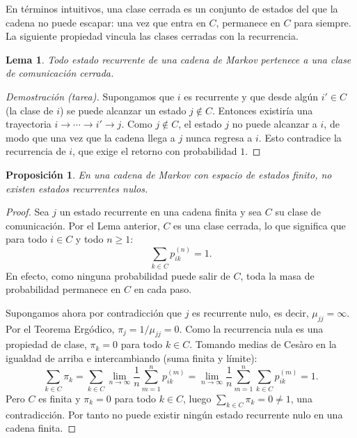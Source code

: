 \documentclass[12pt]{book}
\newtheorem{lemma}{Lema}[section]
\newtheorem{proposition}{Proposición}[chapter]
\begin{document}
En términos intuitivos, una clase cerrada es un conjunto de estados del que la cadena no puede escapar: una vez que entra en $C$, permanece en $C$ para siempre. La siguiente propiedad vincula las clases cerradas con la recurrencia.

\begin{lemma}
    Todo estado recurrente de una cadena de Markov pertenece a una clase de comunicación cerrada.
\end{lemma}
\begin{proof}[Demostración (tarea)]
    Supongamos que $i$ es recurrente y que desde algún $i' \in C$ (la clase de $i$) se puede alcanzar un estado $j \notin C$. Entonces existiría una trayectoria $i \to \cdots \to i' \to j$. Como $j \notin C$, el estado $j$ no puede alcanzar a $i$, de modo que una vez que la cadena llega a $j$ nunca regresa a $i$. Esto contradice la recurrencia de $i$, que exige el retorno con probabilidad $1$.
\end{proof}

\begin{proposition}
En una cadena de Markov con espacio de estados finito, no existen estados recurrentes nulos.
\end{proposition}

\begin{proof}
    Sea $j$ un estado recurrente en una cadena finita y sea $C$ su clase de comunicación. Por el Lema anterior, $C$ es una clase cerrada, lo que significa que para todo $i \in C$ y todo $n \ge 1$:
    \[
        \sum_{k \in C} p_{ik}^{(n)} = 1.
    \]
    En efecto, como ninguna probabilidad puede salir de $C$, toda la masa de probabilidad permanece en $C$ en cada paso.

    Supongamos ahora por contradicción que $j$ es recurrente nulo, es decir, $\mu_{jj} = \infty$. Por el Teorema Ergódico, $\pi_j = 1/\mu_{jj} = 0$. Como la recurrencia nula es una propiedad de clase, $\pi_k = 0$ para todo $k \in C$. Tomando medias de Cesàro en la igualdad de arriba e intercambiando (suma finita y límite):
    \[
        \sum_{k \in C} \pi_k = \sum_{k \in C} \lim_{n\to\infty}\frac{1}{n}\sum_{m=1}^n p_{ik}^{(m)} = \lim_{n\to\infty}\frac{1}{n}\sum_{m=1}^n \sum_{k\in C} p_{ik}^{(m)} = 1.
    \]
    Pero $C$ es finita y $\pi_k = 0$ para todo $k \in C$, luego $\sum_{k\in C}\pi_k = 0 \neq 1$, una contradicción. Por tanto no puede existir ningún estado recurrente nulo en una cadena finita.
\end{proof}
\end{document}

